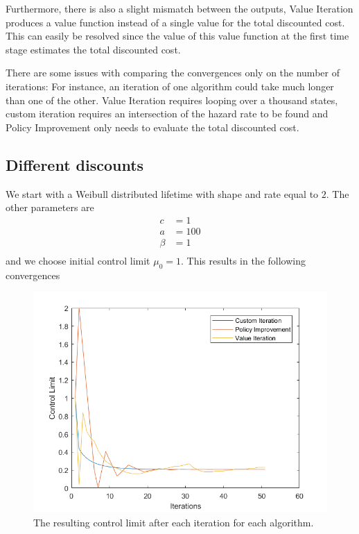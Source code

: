Furthermore, there is also a slight mismatch between the outputs, Value Iteration produces a value function instead of a single value for the total discounted cost.
This can easily be resolved since the value of this value function at the first time stage estimates the total discounted cost.

There are some issues with comparing the convergences only on the number of iterations:
For instance, an iteration of one algorithm could take much longer than one of the other.
Value Iteration requires looping over a thousand states, custom iteration requires an intersection of the hazard rate to be found and Policy Improvement only needs to evaluate the total discounted cost.
\subsection{Different discounts}
We start with a Weibull distributed lifetime with shape and rate equal to $2$.
The other parameters are
\begin{equation}
\begin{split}
c&=1\\
a&=100\\
\beta&=1\\
\end{split}
\end{equation}
and we choose initial control limit $\mu_0=1$.
This results in the following convergences
\begin{figure}[H]
\centering
\includegraphics[width=\textwidth]{Plots/CL Weibull2-2 Discount-1 Start-1.png}
\caption{The resulting control limit after each iteration for each algorithm.}
\end{figure}

